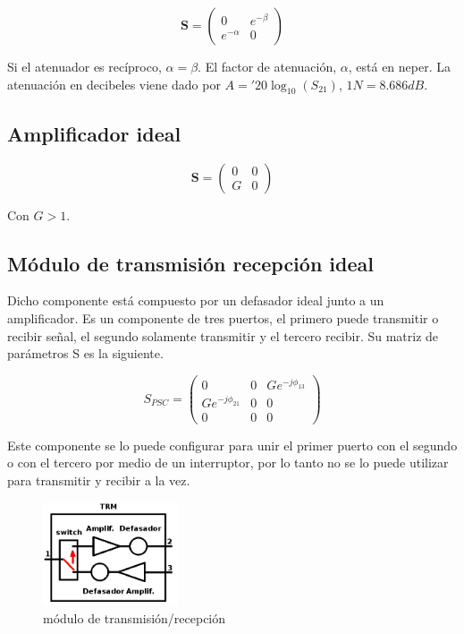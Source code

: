 $$
\mathbf{S} = \begin{pmatrix} 0 & e^{-\beta}\\e^{-\alpha} & 0\end{pmatrix}
$$

Si el atenuador es recíproco, $\alpha = \beta$. El factor de atenuación, $\alpha$, está en neper. La atenuación en decibeles
viene dado por $A = '20\log_{10}(S_{21})$, $1N = 8.686dB$.


\subsection{Amplificador ideal}

$$
\mathbf{S} = \begin{pmatrix} 0 & 0\\G & 0\end{pmatrix}
$$

Con $G > 1$.


\subsection{Módulo de transmisión recepción ideal}

Dicho componente está compuesto por un defasador ideal junto a un amplificador. Es un componente de tres puertos, el primero 
puede transmitir o recibir señal, el segundo solamente transmitir y el tercero recibir. Su matriz de parámetros S es la siguiente.

$$
	S_{PSC} = \begin{pmatrix} 0&0&Ge^{-j\phi_{13}} \\ Ge^{-j\phi_{21}}&0&0 \\ 0&0&0\end{pmatrix} 
$$

Este componente se lo puede configurar para unir el primer puerto con el segundo o con el tercero por medio de un interruptor, 
por lo tanto no se lo puede utilizar para transmitir y recibir a la vez. 

\begin{figure}[H]
 \centering
 \includegraphics[width=4cm]{gfx/trm.png}
 \caption{módulo de transmisión/recepción}
 \label{fig:trm}
\end{figure}


